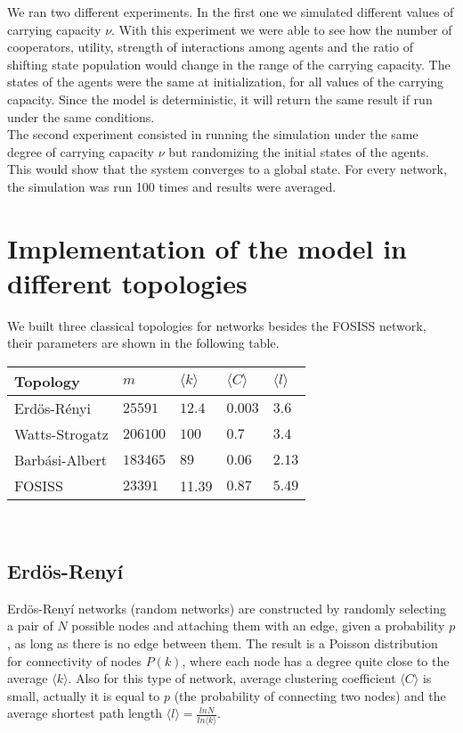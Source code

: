 \documentclass{bmcart}
\begin{document}
We ran two different experiments. In the first one we simulated different
values of carrying capacity $\nu$. With this experiment we were able
to see how the number of cooperators, utility, strength of interactions
among agents and the ratio of shifting state population would change
in the range of the carrying capacity. The states of the agents were
the same at initialization, for all values of the carrying
capacity. Since the model is deterministic, it will return the same
result if run under the same conditions.\\

The second experiment consisted in running the simulation under the
same degree of carrying capacity $\nu$ but randomizing the initial
states of the agents. This would show that the system converges to a
global state. For every network, the simulation was run 100 times and
results were averaged.

\section*{Implementation of the model in different topologies}

We built three classical topologies for networks besides the FOSISS network, their parameters are shown in the following table.\\


\begin{tabular}{| l |  l | l |l|l|}
\hline
\bf{Topology}       & $m$              & $\langle k \rangle$          & $\langle C \rangle$      & $\langle l \rangle$ \\ \hline
Erd\"{o}s-R\'enyi  &  $25591$      &  $12.4$        &  $0.003$ & $3.6$  \\ \hline
Watts-Strogatz    &  $206100$   &  $100$         &  $0.7$      & $3.4$  \\ \hline
Barb\'asi-Albert    &  $183465$   &  $89$           &  $0.06$    & $2.13$ \\ \hline
FOSISS                    &  $23391$     &   11.39     &  $0.87$    &  $5.49$ \\ \hline
\end{tabular}\\ 


\subsection*{Erd\"{o}s-Reny\'i}

Erd\"{o}s-Reny\'i networks \cite{ErdosRenyi:59} (random networks) are
constructed by randomly selecting a pair of $N$ possible nodes and
attaching them with an edge, given a probability $p$, as long as there
is no edge between them. The result is a Poisson distribution for
connectivity of nodes $P(k)$, where each node has a degree quite close
to the average $\langle k \rangle$. Also for this type of network,
average clustering coefficient $\langle C \rangle$ is small, actually
it is equal to $p$ (the probability of connecting two nodes) and the
average shortest path length
$\langle l \rangle = \frac{lnN}{ln\langle k \rangle}$.
\end{document}
